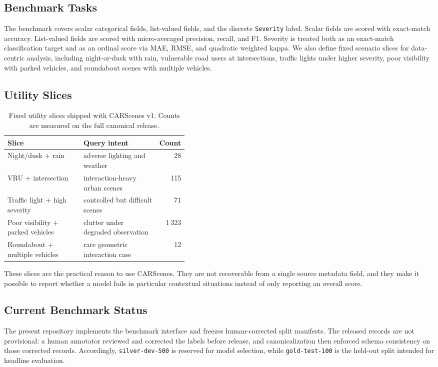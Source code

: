 \subsection{Benchmark Tasks}
The benchmark covers scalar categorical fields, list-valued fields, and the discrete \texttt{Severity} label. Scalar fields are scored with exact-match accuracy. List-valued fields are scored with micro-averaged precision, recall, and F1. Severity is treated both as an exact-match classification target and as an ordinal score via MAE, RMSE, and quadratic weighted kappa. We also define fixed scenario slices for data-centric analysis, including night-or-dusk with rain, vulnerable road users at intersections, traffic lights under higher severity, poor visibility with parked vehicles, and roundabout scenes with multiple vehicles.

\subsection{Utility Slices}
\begin{table}[t]
    \centering
    \caption{Fixed utility slices shipped with CARScenes v1. Counts are measured on the full canonical release.}
    \label{tab:utility_slices}
    \begin{tabular}{lp{0.42\linewidth}r}
        \toprule
        Slice & Query intent & Count \\
        \midrule
        Night/dusk + rain & adverse lighting and weather & 28 \\
        VRU + intersection & interaction-heavy urban scenes & 115 \\
        Traffic light + high severity & controlled but difficult scenes & 71 \\
        Poor visibility + parked vehicles & clutter under degraded observation & 1\,323 \\
        Roundabout + multiple vehicles & rare geometric interaction case & 12 \\
        \bottomrule
    \end{tabular}
\end{table}

These slices are the practical reason to use CARScenes. They are not recoverable from a single source metadata field, and they make it possible to report whether a model fails in particular contextual situations instead of only reporting an overall score.

\subsection{Current Benchmark Status}
The present repository implements the benchmark interface and freezes human-corrected split manifests. The released records are not provisional: a human annotator reviewed and corrected the labels before release, and canonicalization then enforced schema consistency on those corrected records. Accordingly, \texttt{silver-dev-500} is reserved for model selection, while \texttt{gold-test-100} is the held-out split intended for headline evaluation.

